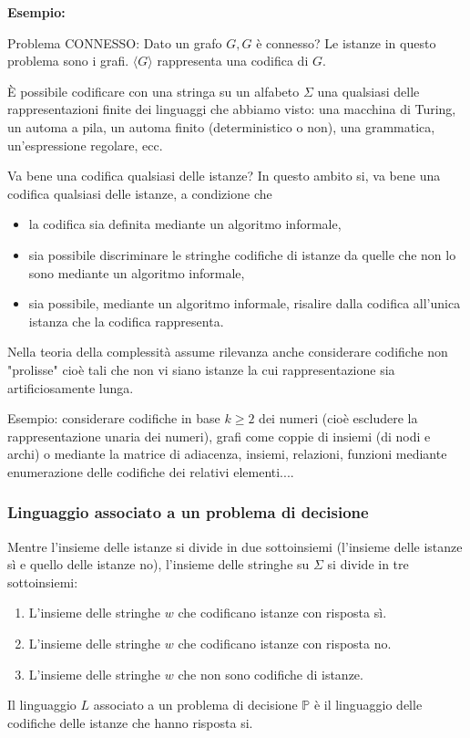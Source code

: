 \vspace{5mm}

\textbf{Esempio:}

Problema CONNESSO: Dato un grafo $G, G$ è connesso?
Le istanze in questo problema sono i grafi.
$\langle G\rangle$ rappresenta una codifica di $G$.

\vspace{5mm}

È possibile codificare con una stringa su un alfabeto $\Sigma$ una qualsiasi delle rappresentazioni finite dei linguaggi che abbiamo visto: una macchina di Turing, un automa a pila, un automa finito (deterministico o non), una grammatica, un'espressione regolare, ecc.

\vspace{5mm}

Va bene una codifica qualsiasi delle istanze?
In questo ambito si, va bene una codifica qualsiasi delle istanze, a condizione che
\begin{itemize}
    \item la codifica sia definita mediante un algoritmo informale,
    \item sia possibile discriminare le stringhe codifiche di istanze da quelle che non lo sono mediante un algoritmo informale,
    \item sia possibile, mediante un algoritmo informale, risalire dalla codifica all'unica istanza che la codifica rappresenta.
\end{itemize}
Nella teoria della complessità assume rilevanza anche considerare codifiche non "prolisse" cioè tali che non vi siano istanze la cui rappresentazione sia artificiosamente lunga.

\vspace{5mm}

Esempio: considerare codifiche in base $k \geq 2$ dei numeri (cioè escludere la rappresentazione unaria dei numeri),
grafi come coppie di insiemi (di nodi e archi) o mediante la matrice di adiacenza,
insiemi, relazioni, funzioni mediante enumerazione delle codifiche dei relativi elementi....

\subsubsection{Linguaggio associato a un problema di decisione}

Mentre l'insieme delle istanze si divide in due sottoinsiemi (l'insieme delle istanze sì e quello delle istanze no), l'insieme delle stringhe su $\Sigma$ si divide in tre sottoinsiemi:
\begin{enumerate}
    \item L'insieme delle stringhe $w$ che codificano istanze con risposta sì.
    \item L'insieme delle stringhe $w$ che codificano istanze con risposta no.
    \item L'insieme delle stringhe $w$ che non sono codifiche di istanze.
\end{enumerate}
Il linguaggio $L$ associato a un problema di decisione $\mathbb{P}$ è il linguaggio delle codifiche delle istanze che hanno risposta si.

